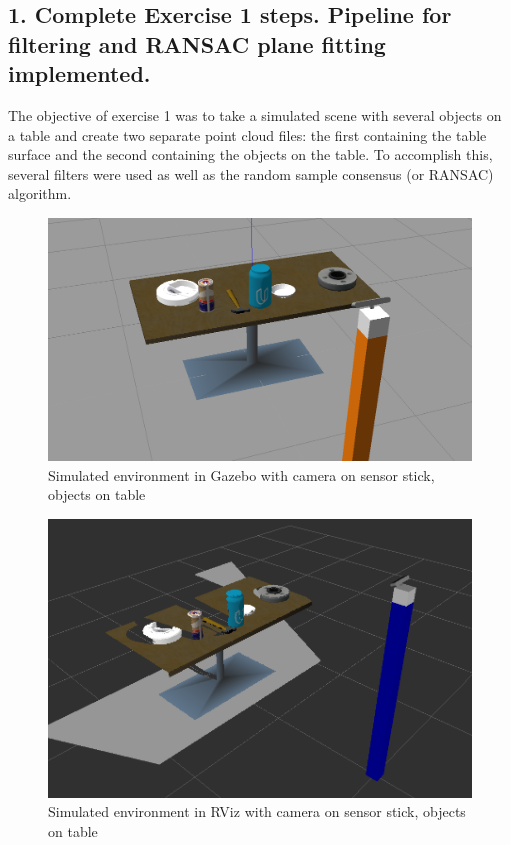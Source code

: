 \documentclass{article}
\begin{document}
\subsection{1. Complete Exercise 1 steps. Pipeline for filtering and RANSAC plane fitting implemented.}
The objective of exercise 1 was to take a simulated scene with several objects on a table and create two separate point cloud files: the first containing the table surface and the second containing the objects on the table. To accomplish this, several filters were used as well as the random sample consensus (or RANSAC) algorithm.

\begin{figure}[H]
    \includegraphics[width=\linewidth]{gazeboscene.png}
    \caption{Simulated environment in Gazebo with camera on sensor stick, objects on table}
    \label{fig:gazebo}
\end{figure}

\begin{figure}[H]
    \includegraphics[width=\linewidth]{scene.png}
    \caption{Simulated environment in RViz with camera on sensor stick, objects on table}
    \label{fig:scene}
\end{figure}
\end{document}
